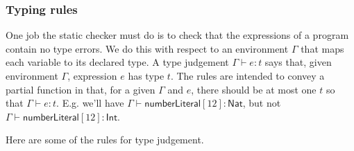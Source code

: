 \documentclass[12pt]{article}
\begin{document}
\subsubsection{Typing rules}

One job the static checker must do is to check that the expressions of a
program contain no type errors. We do this with respect to an environment $%
\Gamma $ that maps each variable to its declared type. A type judgement $%
\Gamma \vdash e:t$ says that, given environment $\Gamma $, expression $e$
has type $t$. The rules are intended to convey a partial function in that,
for a given $\Gamma $ and $e$, there should be at most one $t$ so that $%
\Gamma \vdash e:t$. E.g. we'll have $\Gamma \vdash \mathsf{numberLiteral}%
[12]:\mathsf{Nat}$, but not $\Gamma \vdash \mathsf{numberLiteral}[12]:%
\mathsf{Int}$.

Here are some of the rules for type judgement.
\end{document}
